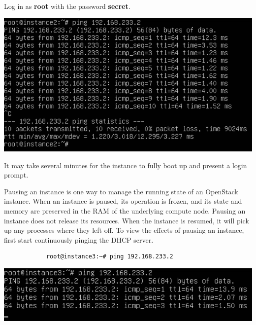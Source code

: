 \documentclass[letterpaper, 12pt]{article}
\begin{document}
\begin{enumerate}
    \begin{labstep}
        Log in as \textbf{root} with the password \textbf{secret}.

        \begin{center}
            \includegraphics[width=\linewidth]{images/part3/step6.png}
        \end{center}
    \end{labstep}

    \begin{notebox}
        It may take several minutes for the instance to fully boot up and present a login prompt.
    \end{notebox}

    \begin{labstep}
        Pausing an instance is one way to manage the running state of an OpenStack instance.
        When an instance is paused, its operation is frozen, and its state and memory are preserved in the RAM of the underlying compute node.
        Pausing an instance does not release its resources.
        When the instance is resumed, it will pick up any processes where they left off.
        To view the effects of pausing an instance, first start continuously pinging the DHCP server.
        \begin{lstlisting}
            root@instance3:~# ping 192.168.233.2
        \end{lstlisting}

        \begin{center}
            \includegraphics[width=\linewidth]{images/part3/step7.png}
        \end{center}
    \end{labstep}


\end{enumerate}
\end{document}
